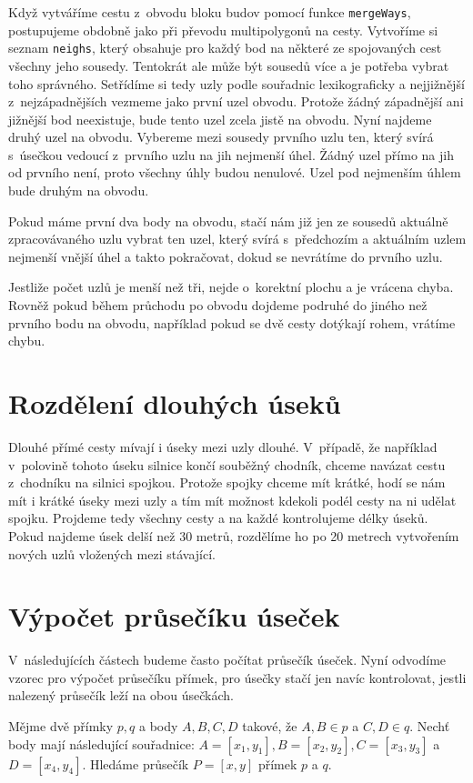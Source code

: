 Když vytváříme cestu z~obvodu bloku budov pomocí funkce \verb|mergeWays|,
postupujeme obdobně jako při převodu multipolygonů na cesty. Vytvoříme si seznam
\verb|neighs|, který obsahuje pro každý bod na některé ze spojovaných cest
všechny jeho sousedy. Tentokrát ale může být sousedů více a je potřeba vybrat
toho správného. Setřídíme si tedy uzly podle souřadnic lexikograficky a
nejjižnější z~nejzápadnějších vezmeme jako první uzel obvodu.  Protože žádný
západnější ani jižnější bod neexistuje, bude tento uzel zcela jistě na obvodu.
Nyní najdeme druhý uzel na obvodu. Vybereme mezi sousedy prvního uzlu ten, který
svírá s~úsečkou vedoucí z~prvního uzlu na jih nejmenší úhel. Žádný uzel přímo na
jih od prvního není, proto všechny úhly budou nenulové. Uzel pod nejmenším úhlem
bude druhým na obvodu.

Pokud máme první dva body na obvodu, stačí nám již jen ze sousedů aktuálně
zpracovávaného uzlu vybrat ten uzel, který svírá s~předchozím a aktuálním uzlem
nejmenší vnější úhel a takto pokračovat, dokud se nevrátíme do prvního uzlu.

Jestliže počet uzlů je menší než tři, nejde o~korektní plochu a je vrácena chyba.
Rovněž pokud během průchodu po obvodu dojdeme podruhé do jiného než prvního bodu
na obvodu, například pokud se dvě cesty dotýkají rohem, vrátíme chybu.

\section{Rozdělení dlouhých úseků}
Dlouhé přímé cesty mívají i úseky mezi uzly dlouhé. V~případě, že například
v~polovině tohoto úseku silnice končí souběžný chodník, chceme navázat cestu
z~chodníku na silnici spojkou. Protože spojky chceme mít krátké, hodí se nám mít i
krátké úseky mezi uzly a tím mít možnost kdekoli podél cesty na ni udělat
spojku. Projdeme tedy všechny cesty a na každé kontrolujeme délky úseků. Pokud
najdeme úsek delší než 30 metrů, rozdělíme ho po 20 metrech vytvořením nových
uzlů vložených mezi stávající.

\section{Výpočet průsečíku úseček}
V~následujících částech budeme často počítat průsečík úseček. Nyní odvodíme
vzorec pro výpočet průsečíku přímek, pro úsečky stačí jen navíc kontrolovat,
jestli nalezený průsečík leží na obou úsečkách.


Mějme dvě přímky $p,q$ a body $A,B,C,D$ takové, že $A,B \in p$ a $C,D \in q$.
Nechť body mají následující souřadnice: $A=[x_1,y_1], B=[x_2,y_2], C=[x_3,y_3]$
a $D=[x_4,y_4]$. Hledáme průsečík $P = [x,y]$ přímek $p$ a $q$.

